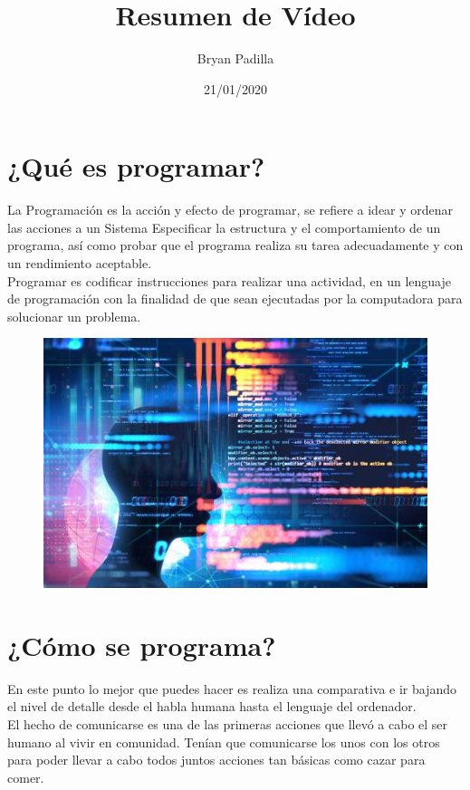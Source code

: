 \documentclass{article}
\title{Resumen de  Vídeo}
\author{Bryan Padilla}
\date{21/01/2020}
\begin{document}
\maketitle

\section{¿Qué es programar?}
\large
La Programación es la acción y efecto de programar, se refiere a idear y ordenar las acciones a un Sistema  
Especificar	la	estructura y	el	comportamiento de	un	programa,	así	como	probar que	el	programa	realiza	su	tarea	adecuadamente y	con	un	rendimiento aceptable.\\
Programar es codificar instrucciones para realizar una actividad, en un lenguaje de programación con la finalidad de que sean ejecutadas por la computadora para solucionar un problema.\

\begin{figure}[h!]
\centering
\includegraphics[scale=0.9]{lenguajes.jpg}\\[2cm]
\end{figure}

\section{¿Cómo se programa?}
\large
En este punto lo mejor que puedes hacer es realiza una comparativa e ir bajando el nivel de detalle desde el habla humana hasta el lenguaje del ordenador.\\
El hecho de comunicarse es una de las primeras acciones que llevó a cabo el ser humano al vivir en comunidad. Tenían que comunicarse los unos con los otros para poder llevar a cabo todos juntos acciones tan básicas como cazar para comer.
\end{document}
